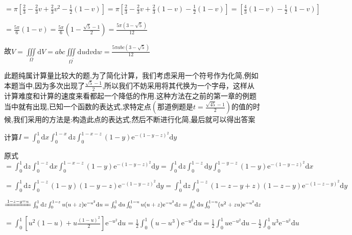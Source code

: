 \begin{xiti}
\begin{solution}
		$=\pi \left[\frac{2}{3} - \frac{2}{3} v + \frac{2}{3} v^{2} - \frac{1}{2} (1-v) \right] = \pi \left[\frac{2}{3} - \frac{2}{3} v + \frac{2}{3} (1-v)  - \frac{1}{2} (1-v) \right] = \left[\frac{4}{3} (1-v)  - \frac{1}{2} (1-v) \right]$
		
		$= \frac{5\pi}{6} (1-v) = \frac{5\pi}{6} \left( 1-\frac{\sqrt{5}-1}{2} \right) = \frac{5\pi (3-\sqrt{5})}{12}$
		
		故$V=\iiint\limits_{\Omega} \mathrm{d} V = abc \iiint\limits_{{\Omega}^{\prime}} \mathrm{d} u \mathrm{d} v \mathrm{d} w = \frac{5\pi abc (3-\sqrt 5)}{12}$
		
		\begin{note}
			此题纯属计算量比较大的题,为了简化计算，我们考虑采用一个符号作为化简,例如本题当中,因为多次出现了$\frac{\sqrt{5}-1}{2}$,所以我们不妨采用将其代换为一个字母，这样从计算难度和计算的速度来看都起一个降低的作用.这种方法在之前的第一章的例题当中就有出现,已知一个函数的表达式,求特定点$\left( \text{那道例题是} t= \frac{ \sqrt{45}-1 } {2}\right)$的值的时候,我们采用的方法是:构造此点的表达式,然后不断进行化简,最后就可以得出答案
		\end{note}
	\end{solution}
	
	\item 计算$
	I=\int_{0}^{1} \mathrm{d} x \int_{0}^{1-x} \mathrm{d} z \int_{0}^{1-x-z}(1-y) \mathrm{e}^{-(1-y-z)^{2}} \mathrm{d} y$
	\begin{solution}
		原式$=\int_{0}^{1} \mathrm{d} z \int_{0}^{1-z} \mathrm{d} x \int_{0}^{1-x-z}(1-y) \mathrm{e}^{-(1-y-z)^{2}} \mathrm{d} y = \int_{0}^{1} \mathrm{d} z \int_{0}^{1-z} \mathrm{d} y \int_{0}^{1-y-z}(1-y) \mathrm{e}^{-(1-y-z)^{2}} \mathrm{d} x$
		
		$=\int_{0}^{1} \mathrm{d} z \int_{0}^{1-z} (1-y)(1-y-z) \mathrm{e}^{-(1-y-z)^{2}} \mathrm{d} y  =\int_{0}^{1} \mathrm{d} z \int_{0}^{1-z} (1-z-y+z)(1-z-y) \mathrm{e}^{-(1-z-y)^{2}} \mathrm{d} y$
		
		$\xlongequal{1-z-y=u} \int_{0}^{1} \mathrm{d} z \int_{0}^{1-z} u(u+z) \mathrm{e}^{-u^{2}} \mathrm{d} u = \int_{0}^{1} \mathrm{d} u \int_{0}^{1-u} u(u+z) \mathrm{e}^{-u^{2}} \mathrm{d} z = \int_{0}^{1} \mathrm{d} u \int_{0}^{1-u} (u^{2}+zu) \mathrm{e}^{-u^{2}} \mathrm{d} z$
		
		$= \int_{0}^{1} \left[u^{2}(1-u)+u \frac{(1-u)^{2}}{2} \right] \mathrm{e}^{-u^{2}} \mathrm{d} u = \frac{1}{2} \int_{0}^{1} (u-u^{3}) \mathrm{e}^{-u^{2}} \mathrm{d} u = \frac{1}{2} \int_{0}^{1} u \mathrm{e}^{-u^{2}} \mathrm{d} u-\frac{1}{2} \int_{0}^{1} u^{3} \mathrm{e}^{-u^{2}} \mathrm{d} u $
		

\end{solution}
\end{xiti}
